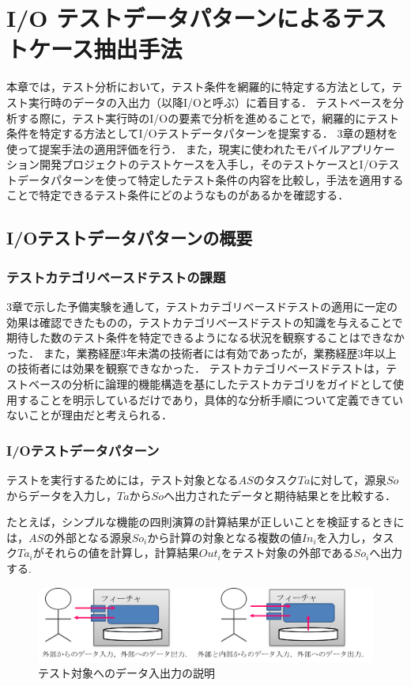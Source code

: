 
\chapter{I/O テストデータパターンによるテストケース抽出手法}\label{chap:4}
本章では，テスト分析において，テスト条件を網羅的に特定する方法として，テスト実行時のデータの入出力（以降I/Oと呼ぶ）に着目する．
テストベースを分析する際に，テスト実行時のI/Oの要素で分析を進めることで，網羅的にテスト条件を特定する方法としてI/Oテストデータパターンを提案する．
3章の題材を使って提案手法の適用評価を行う．
また，現実に使われたモバイルアプリケーション開発プロジェクトのテストケースを入手し，そのテストケースとI/Oテストデータパターンを使って特定したテスト条件の内容を比較し，手法を適用することで特定できるテスト条件にどのようなものがあるかを確認する．

\newpage
\section{I/Oテストデータパターンの概要} \label{sec:4-1}
\subsection{テストカテゴリベースドテストの課題} \label{sec:4-1-1}
3章で示した予備実験を通して，テストカテゴリベースドテストの適用に一定の効果は確認できたものの，テストカテゴリベースドテストの知識を与えることで期待した数のテスト条件を特定できるようになる状況を観察することはできなかった．
また，業務経歴3年未満の技術者には有効であったが，業務経歴3年以上の技術者には効果を観察できなかった．
テストカテゴリベースドテストは，テストベースの分析に論理的機能構造を基にしたテストカテゴリをガイドとして使用することを明示しているだけであり，具体的な分析手順について定義できていないことが理由だと考えられる．

\subsection{I/Oテストデータパターン} \label{sec:4-1-1}
テストを実行するためには，テスト対象となる$AS$のタスク$Ta$に対して，源泉$So$からデータを入力し，$Ta$から$So$へ出力されたデータと期待結果とを比較する．

たとえば，シンプルな機能の四則演算の計算結果が正しいことを検証するときには，$AS$の外部となる源泉$So_i$から計算の対象となる複数の値$In_i$を入力し，タスク$Ta_i$がそれらの値を計算し，計算結果$Out_i$をテスト対象の外部である$So_i$へ出力する.

\begin{figure}[htbp]
 \begin{center}
 \includegraphics[width=12cm]{./image/D-3-Fig4.png}
 \caption{テスト対象へのデータ入出力の説明}
 \label{fig:D-3-Fig4}
 \end{center}
\end{figure}

